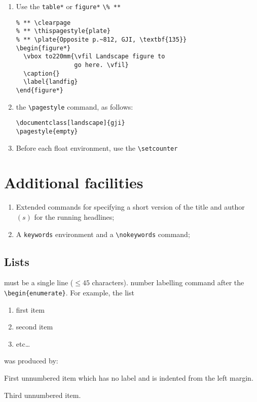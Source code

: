 \begin{enumerate}
  \item Use the \verb"table*" or \verb"figure*"
        \verb"\% **"
\begin{verbatim}
% ** \clearpage
% ** \thispagestyle{plate}
% ** \plate{Opposite p.~812, GJI, \textbf{135}}
\begin{figure*}
  \vbox to220mm{\vfil Landscape figure to
                go here. \vfil}
  \caption{}
  \label{landfig}
\end{figure*}
\end{verbatim}
\item the \verb"\pagestyle" command, as follows:
\begin{verbatim}
\documentclass[landscape]{gji}
\pagestyle{empty}
\end{verbatim}
  \item Before each float environment, use the \verb"\setcounter"
\end{enumerate}


\section{Additional facilities}

\begin{enumerate}
  \item Extended commands for specifying a short version of the title and
        author$(s)$ for the running headlines;
  \item A \verb"keywords" environment and a \verb"\nokeywords" command;
 \end{enumerate}

\subsection{Lists}

must be a single line ($\leqslant 45$ characters).
number labelling command after the \verb"\begin{enumerate}". For example, the
list
\begin{enumerate}
\renewcommand{\theenumi}{(\arabic{enumi})}
  \item first item
  \item second item
  \item etc\ldots
\end{enumerate}
was produced by:
\begin{description}
  \item First unnumbered item which has no label and is indented from the left
        margin.
  \item Third unnumbered item.
\end{description}

